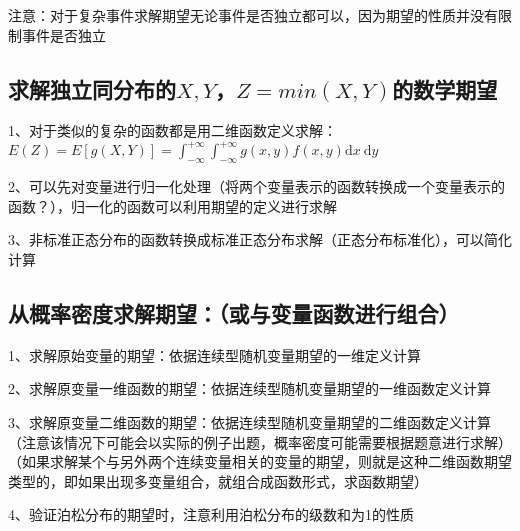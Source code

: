 注意：对于复杂事件求解期望无论事件是否独立都可以，因为期望的性质并没有限制事件是否独立



\subsection{求解独立同分布的$X,Y$，$Z=min(X,Y)$的数学期望}

1、对于类似的复杂的函数都是用二维函数定义求解：$E(Z)=E[g(X, Y)]=\int_{-\infty}^{+\infty} \int_{-\infty}^{+\infty} g(x, y) f(x, y) \mathrm{d} x \mathrm{~d} y$

2、可以先对变量进行归一化处理（将两个变量表示的函数转换成一个变量表示的函数？），归一化的函数可以利用期望的定义进行求解

3、非标准正态分布的函数转换成标准正态分布求解（正态分布标准化），可以简化计算



\subsection{从概率密度求解期望：（或与变量函数进行组合）}

1、求解原始变量的期望：依据连续型随机变量期望的一维定义计算

2、求解原变量一维函数的期望：依据连续型随机变量期望的一维函数定义计算

3、求解原变量二维函数的期望：依据连续型随机变量期望的二维函数定义计算（注意该情况下可能会以实际的例子出题，概率密度可能需要根据题意进行求解）（如果求解某个与另外两个连续变量相关的变量的期望，则就是这种二维函数期望类型的，即如果出现多变量组合，就组合成函数形式，求函数期望）

4、验证泊松分布的期望时，注意利用泊松分布的级数和为1的性质

